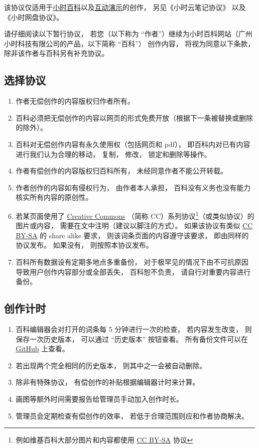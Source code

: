 
该协议仅适用于\href{http://wuli.wiki/online/}{小时百科}以及\href{http://wuli.wiki/apps/}{互动演示}的创作， 另见《小时云笔记协议》 以及《小时网盘协议》。

请仔细阅读以下暂行协议， 若您（以下称为 “作者”）继续为小时百科网站（广州小时科技有限公司的产品，以下简称 “百科”） 创作内容， 将视为同意以下条款， 除非该作者与百科另有补充协议。

\subsection{选择协议}
\begin{enumerate}
\item 作者无偿创作的内容版权归作者所有。
\item 百科必须把无偿创作的内容以网页的形式免费开放（根据下一条被替换或删除的除外）。
\item 百科对无偿创作内容有永久使用权（包括网页和 pdf）， 即百科内对已有内容进行我们认为合理的移动， 复制， 修改， 锁定和删除等操作。
\item 作者有偿创作的内容版权归百科所有， 未经同意作者不能公开转载。
\item 作者创作的内容如有侵权行为， 由作者本人承担， 百科没有义务也没有能力核实所有内容的原创性。
\item 若某页面使用了 \href{https://creativecommons.org/licenses/}{Creative Commons} （简称 CC）系列协议\footnote{例如维基百科大部分图片和内容都使用 \href{https://creativecommons.org/licenses/by-sa/3.0/}{CC BY-SA} 协议}（或类似协议）的图片或内容， 需要在文中注明（建议以脚注的方式）。 如果该协议有类似 \href{https://creativecommons.org/licenses/by-sa/3.0/}{CC BY-SA} 的 share alike 要求， 则该词条页面的内容遵守该要求， 即由同样的协议发布。 如果没有， 则按照本协议发布。
\item 百科所有数据设有定期多地点多重备份， 对于极罕见的情况下由不可抗原因导致用户创作内容部分或全部丢失， 百科恕不负责， 请自行对重要内容进行备份。
\end{enumerate}

\subsection{创作计时}
\begin{enumerate}
\item 百科编辑器会对打开的词条每 5 分钟进行一次的检查， 若内容发生改变， 则保存一次历史版本， 可以通过 “历史版本” 按钮查看。 所有备份文件可以在 \href{https://github.com/MacroUniverse/PhysWiki-backup}{GitHub} 上查看。
\item 若出现两个完全相同的历史版本， 则其中之一会被自动删除。
\item 除非有特殊协议， 有偿创作的补贴根据编辑器计时来计算。
\item 画图等额外时间需要报告给管理员手动加入创作时长。
\item 管理员会定期检查有偿创作的效率， 若低于合理范围则应和作者协商解决。
\end{enumerate}

